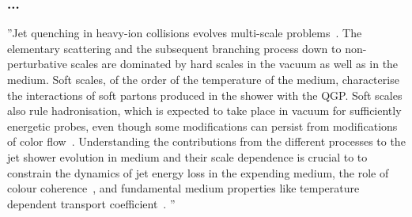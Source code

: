 %
%
%
%
%
%
%
%
%


\subsubsection*{...}
''Jet quenching in heavy-ion collisions evolves multi-scale problems~\cite{Kurkela:2014tla,Tachibana:2018yae}. The elementary scattering and the subsequent branching process down to non-perturbative scales are dominated by hard scales in the vacuum as well as in the medium. Soft scales, of the order of the temperature of the medium, characterise the interactions of soft partons produced in the shower with the QGP. Soft scales also rule hadronisation, which is expected to take place in vacuum for sufficiently energetic probes, even though some modifications can persist from modifications of color flow~\cite{Aurenche:2011rd,Beraudo:2011bh,Beraudo:2012bq}. Understanding the contributions from the different processes to the jet shower evolution in medium and their scale dependence is crucial to to constrain the dynamics of jet energy loss in the expending medium, the role of colour coherence~\cite{CasalderreySolana:2012ef}, and fundamental medium properties like temperature dependent transport coefficient~\cite{DEramo:2012uzl,Ayala:2016pvm}.
''


